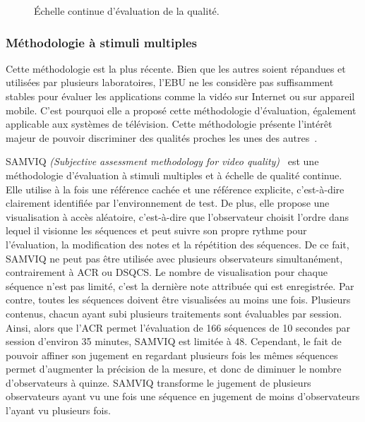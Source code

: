\begin{figure}[htbp]
  \centering
  \begin{tikzpicture}[scale=0.95]\end{tikzpicture}
  \caption{Échelle continue d'évaluation de la qualité.}
  \label{fig:echelleQualitéContinue}
\end{figure}


\subsubsection{Méthodologie à stimuli multiples} \label{tests:samviq}
Cette méthodologie est la plus récente. Bien que les autres soient répandues et utilisées par plusieurs laboratoires, l'EBU ne les considère pas suffisamment stables pour évaluer les applications comme la vidéo sur Internet ou sur appareil mobile. C'est pourquoi elle a proposé cette méthodologie d'évaluation, également applicable aux systèmes de télévision. Cette méthodologie présente l'intérêt majeur de pouvoir discriminer des qualités proches les unes des autres~\cite{blin-vpqm2006}.

SAMVIQ \emph{(Subjective assessment methodology for video quality)}~\cite{ebu-samviq} est une méthodologie d'évaluation à stimuli multiples et à échelle de qualité continue. Elle utilise à la fois une référence cachée et une référence explicite, c'est-à-dire clairement identifiée par l'environnement de test. De plus, elle propose une visualisation à accès aléatoire, c'est-à-dire que l'observateur choisit l'ordre dans lequel il visionne les séquences et peut suivre son propre rythme pour l'évaluation, la modification des notes et la répétition des séquences. De ce fait, SAMVIQ ne peut pas être utilisée avec plusieurs observateurs simultanément, contrairement à ACR ou DSQCS. Le nombre de visualisation pour chaque séquence n'est pas limité, c'est la dernière note attribuée qui est enregistrée. Par contre, toutes les séquences doivent être visualisées au moins une fois. Plusieurs contenus, chacun ayant subi plusieurs traitements sont évaluables par session. Ainsi, alors que l'ACR permet l'évaluation de 166 séquences de 10 secondes par session d'environ 35 minutes, SAMVIQ est limitée à 48. Cependant, le fait de pouvoir affiner son jugement en regardant plusieurs fois les mêmes séquences permet d'augmenter la précision de la mesure, et donc de diminuer le nombre d'observateurs à quinze. SAMVIQ transforme le jugement de plusieurs observateurs ayant vu une fois une séquence en jugement de moins d'observateurs l'ayant vu plusieurs fois. %

